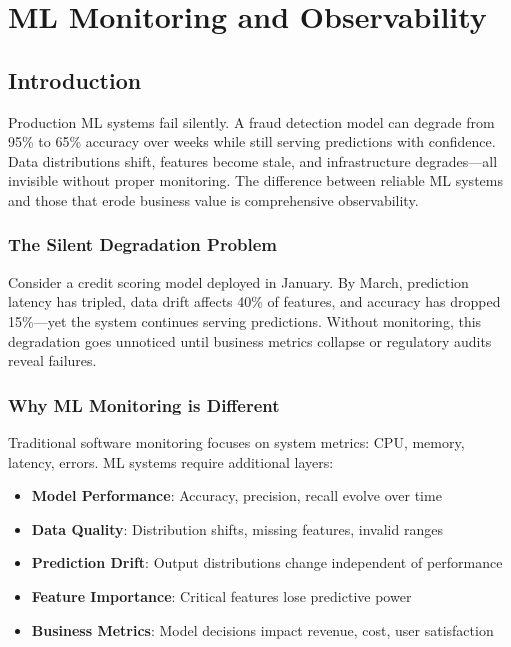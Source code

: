 \chapter{ML Monitoring and Observability}

\section{Introduction}

Production ML systems fail silently. A fraud detection model can degrade from 95\% to 65\% accuracy over weeks while still serving predictions with confidence. Data distributions shift, features become stale, and infrastructure degrades---all invisible without proper monitoring. The difference between reliable ML systems and those that erode business value is comprehensive observability.

\subsection{The Silent Degradation Problem}

Consider a credit scoring model deployed in January. By March, prediction latency has tripled, data drift affects 40\% of features, and accuracy has dropped 15\%---yet the system continues serving predictions. Without monitoring, this degradation goes unnoticed until business metrics collapse or regulatory audits reveal failures.

\subsection{Why ML Monitoring is Different}

Traditional software monitoring focuses on system metrics: CPU, memory, latency, errors. ML systems require additional layers:

\begin{itemize}
    \item \textbf{Model Performance}: Accuracy, precision, recall evolve over time
    \item \textbf{Data Quality}: Distribution shifts, missing features, invalid ranges
    \item \textbf{Prediction Drift}: Output distributions change independent of performance
    \item \textbf{Feature Importance}: Critical features lose predictive power
    \item \textbf{Business Metrics}: Model decisions impact revenue, cost, user satisfaction
\end{itemize}

